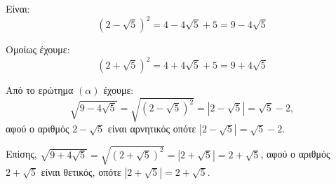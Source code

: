 
\begin{alist}
\item Είναι:
\[(2 - \sqrt{5})^2 = 4 - 4\sqrt{5} + 5 = 9 - 4\sqrt{5}\]

Ομοίως έχουμε:
\[(2 + \sqrt{5})^2 = 4 + 4\sqrt{5} + 5 = 9 + 4\sqrt{5}\]

\item Από το ερώτημα $(\alpha)$ έχουμε:
\[\sqrt{9 - 4\sqrt{5}} = \sqrt{(2 - \sqrt{5})^2} = |2 - \sqrt{5}| = \sqrt{5} - 2,\]
αφού ο αριθμός $2 - \sqrt{5}$ είναι αρνητικός οπότε $|2 - \sqrt{5}| = \sqrt{5} - 2$.

Επίσης, $\sqrt{9 + 4\sqrt{5}} = \sqrt{(2 + \sqrt{5})^2} = |2 + \sqrt{5}| = 2 + \sqrt{5}$, αφού ο αριθμός $2 + \sqrt{5}$ είναι θετικός, οπότε
$|2 + \sqrt{5}| = 2 + \sqrt{5}$.
\end{alist}

